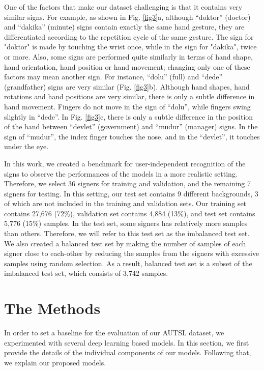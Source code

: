 \documentclass[11pt, a4paper, singlecolumn]{article}
\begin{document}
One of the factors that make our dataset challenging is that it contains very similar signs. For example, as shown in Fig. \ref{fig3}a, although “doktor” (doctor) and “dakika” (minute) signs contain exactly the same hand gesture, they are differentiated according to the repetition cycle of the same gesture. The sign for "doktor" is made by touching the wrist once, while in the sign for "dakika", twice or more. Also, some signs are performed quite similarly in terms of hand shape, hand orientation, hand position or hand movement; changing only one of these factors may mean another sign. For instance, “dolu” (full) and “dede” (grandfather) signs are very similar (Fig. \ref{fig3}b). Although hand shapes, hand rotations and hand positions are very similar, there is only a subtle difference in hand movement. Fingers do not move in the sign of “dolu”, while fingers swing slightly in “dede”. In Fig. \ref{fig3}c, there is only a subtle difference in the position of the hand between “devlet” (government) and “mudur” (manager) signs. In the sign of “mudur”, the index finger touches the nose, and in the “devlet”, it touches under the eye. 


In this work, we created a benchmark for user-independent recognition of the signs to observe the performances of the models in a more realistic setting. Therefore, we select 36 signers for training and validation, and the remaining 7 signers for testing. In this setting, our test set contains 9 different backgrounds, 3 of which are not included in the training and validation sets. Our training set contains 27,676 (72\%), validation set contains 4,884 (13\%), and test set contains 5,776 (15\%) samples. In the test set, some signers has relatively more samples than others. Therefore, we will refer to this test set as the imbalanced test set. We also created a balanced test set by making the number of samples of each signer close to each-other by reducing the samples from the signers with excessive samples using random selection. As a result, balanced test set is a subset of the imbalanced test set, which consists of 3,742 samples.

\section{The Methods}
\label{sec:methods}

In order to set a baseline for the evaluation of our AUTSL dataset, we experimented with several deep learning based models. In this section, we first provide the details of the individual components of our models. Following that, we explain our proposed models.
\end{document}

